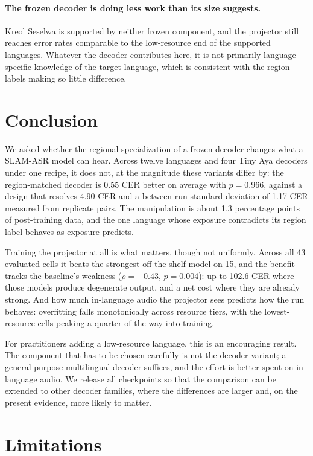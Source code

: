 \documentclass[11pt]{article}
\begin{document}
\paragraph{The frozen decoder is doing less work than its size suggests.}
Kreol Seselwa is supported by neither frozen component, and the projector still reaches error
rates comparable to the low-resource end of the supported languages. Whatever the decoder
contributes here, it is not primarily language-specific knowledge of the target language, which
is consistent with the region labels making so little difference.


\section{Conclusion}
\label{sec:conclusion}

We asked whether the regional specialization of a frozen decoder changes what a SLAM-ASR model
can hear. Across twelve languages and four Tiny Aya decoders under one recipe, it does not, at
the magnitude these variants differ by: the region-matched decoder is 0.55 CER better on average
with $p = 0.966$, against a design that resolves 4.90 CER and a between-run standard deviation of
1.17 CER measured from replicate pairs. The manipulation is about 1.3 percentage points of
post-training data, and the one language whose exposure contradicts its region label behaves as
exposure predicts.

Training the projector at all is what matters, though not uniformly. Across all 43 evaluated
cells it beats the strongest off-the-shelf model on 15, and the benefit tracks the baseline's
weakness ($\rho = -0.43$, $p = 0.004$): up to 102.6 CER where those models produce degenerate
output, and
a net cost where they are already strong. And how much in-language audio the projector sees predicts how
the run behaves: overfitting falls monotonically across resource tiers, with the lowest-resource
cells peaking a quarter of the way into training.

For practitioners adding a low-resource language, this is an encouraging result. The component
that has to be chosen carefully is not the decoder variant; a general-purpose multilingual
decoder suffices, and the effort is better spent on in-language audio. We release all
checkpoints so that the comparison can be extended to other decoder families, where the
differences are larger and, on the present evidence, more likely to matter.

\section*{Limitations}
\end{document}
